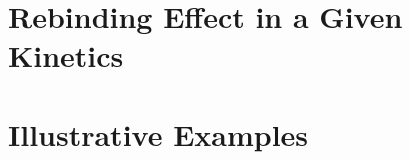 \documentclass[
  12pt,
  a4paper,
  pdftex,
  oneside,
  DIVcalc,
  openright
  ] {scrreprt}
\begin{document}
\chapter{Rebinding Effect in a Given Kinetics}\label{chap:rebinding}
  
  
  
  

\chapter{Illustrative Examples}\label{chap:example}
  

%  


\clearpage
\newpage
{}
\setcounter{page}{2}
%
%
%
%



%  

% 
\end{document}
